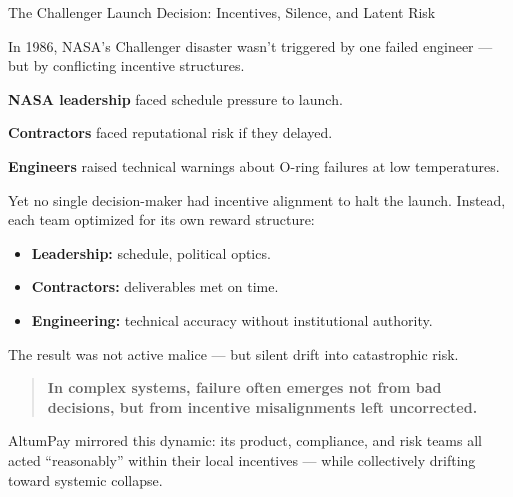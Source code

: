 \begin{HistoricalSidebar}{The Challenger Launch Decision: Incentives, Silence, and Latent Risk}

In 1986, NASA’s Challenger disaster wasn’t triggered by one failed engineer — but by conflicting incentive structures.

\medskip

\textbf{NASA leadership} faced schedule pressure to launch.

\textbf{Contractors} faced reputational risk if they delayed.

\textbf{Engineers} raised technical warnings about O-ring failures at low temperatures.

\medskip

Yet no single decision-maker had incentive alignment to halt the launch. Instead, each team optimized for its own reward structure:

\begin{itemize}
  \item \textbf{Leadership:} schedule, political optics.
  \item \textbf{Contractors:} deliverables met on time.
  \item \textbf{Engineering:} technical accuracy without institutional authority.
\end{itemize}

The result was not active malice — but silent drift into catastrophic risk.

\begin{quote}
\textbf{In complex systems, failure often emerges not from bad decisions, but from incentive misalignments left uncorrected.}
\end{quote}

AltumPay mirrored this dynamic: its product, compliance, and risk teams all acted “reasonably” within their local incentives — while collectively drifting toward systemic collapse.

\end{HistoricalSidebar}


